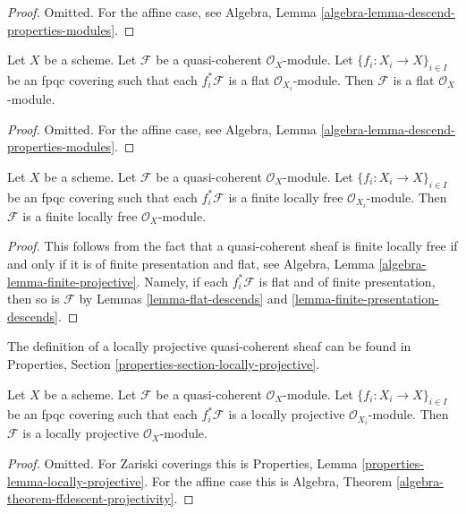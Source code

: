 \begin{proof}
Omitted. For the affine case, see
Algebra, Lemma \ref{algebra-lemma-descend-properties-modules}.
\end{proof}

\begin{lemma}
\label{lemma-flat-descends}
Let $X$ be a scheme.
Let $\mathcal{F}$ be a quasi-coherent $\mathcal{O}_X$-module.
Let $\{f_i : X_i \to X\}_{i \in I}$ be an fpqc covering such that
each $f_i^*\mathcal{F}$ is a flat $\mathcal{O}_{X_i}$-module.
Then $\mathcal{F}$ is a flat $\mathcal{O}_X$-module.
\end{lemma}

\begin{proof}
Omitted. For the affine case, see
Algebra, Lemma \ref{algebra-lemma-descend-properties-modules}.
\end{proof}

\begin{lemma}
\label{lemma-finite-locally-free-descends}
Let $X$ be a scheme.
Let $\mathcal{F}$ be a quasi-coherent $\mathcal{O}_X$-module.
Let $\{f_i : X_i \to X\}_{i \in I}$ be an fpqc covering such that
each $f_i^*\mathcal{F}$ is a finite locally free $\mathcal{O}_{X_i}$-module.
Then $\mathcal{F}$ is a finite locally free $\mathcal{O}_X$-module.
\end{lemma}

\begin{proof}
This follows from the fact that a quasi-coherent sheaf is finite locally
free if and only if it is of finite presentation and flat, see
Algebra, Lemma \ref{algebra-lemma-finite-projective}.
Namely, if each $f_i^*\mathcal{F}$ is flat and of finite presentation,
then so is $\mathcal{F}$ by
Lemmas \ref{lemma-flat-descends} and
\ref{lemma-finite-presentation-descends}.
\end{proof}

\noindent
The definition of a locally projective quasi-coherent sheaf can be found in
Properties, Section \ref{properties-section-locally-projective}.

\begin{lemma}
\label{lemma-locally-projective-descends}
Let $X$ be a scheme.
Let $\mathcal{F}$ be a quasi-coherent $\mathcal{O}_X$-module.
Let $\{f_i : X_i \to X\}_{i \in I}$ be an fpqc covering such that
each $f_i^*\mathcal{F}$ is a locally projective $\mathcal{O}_{X_i}$-module.
Then $\mathcal{F}$ is a locally projective $\mathcal{O}_X$-module.
\end{lemma}

\begin{proof}
Omitted. For Zariski coverings this is
Properties, Lemma \ref{properties-lemma-locally-projective}.
For the affine case this is
Algebra, Theorem \ref{algebra-theorem-ffdescent-projectivity}.
\end{proof}

